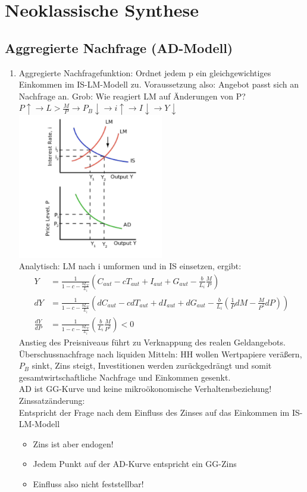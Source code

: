 \documentclass{scrartcl}
\begin{document}
\section{Neoklassische Synthese}
\subsection{Aggregierte Nachfrage (AD-Modell)}
\begin{enumerate}
  \item Aggregierte Nachfragefunktion: Ordnet jedem p ein gleichgewichtiges Einkommen im IS-LM-Modell zu. Voraussetzung also: Angebot passt sich an Nachfrage an. Grob: Wie reagiert LM auf \"{A}nderungen von P?\\
  $P \uparrow \rightarrow L > \frac{M}{P} \rightarrow P_B \downarrow \rightarrow i \uparrow \rightarrow I \downarrow \rightarrow Y \downarrow$\\
  \includegraphics[width=0.5\textwidth]{Bilder/Neoklassische_Synthese_AD_Herleitung.pdf}\\
  Analytisch: LM nach i umformen und in IS einsetzen, ergibt:
  \begin{align*}
     Y &= \frac{1}{1-c -\frac{b L_Y}{L_i}} \left(C_{aut} - c T_{aut} + I_{aut} +G_{aut} - \frac{b}{L_i}\frac{M}{P}\right)\\
     dY &= \frac{1}{1-c -\frac{b L_Y}{L_i}} \left(dC_{aut} - c dT_{aut} + dI_{aut} +dG_{aut} - \frac{b}{L_i} \left(\frac{1}{P}dM-\frac{M}{P^2}dP\right)\right)\\
     \frac{dY}{dP} &= \frac{1}{1-c -\frac{b L_Y}{L_i}} \left(\frac{b}{L_i}\frac{M}{P^2}\right) <0
  \end{align*}
  Anstieg des Preisniveaus f\"{u}hrt zu Verknappung des realen Geldangebots. \"{U}berschussnachfrage nach liquiden Mitteln: HH wollen Wertpapiere ver\"{a}{\ss}ern, $P_B$ sinkt, Zins steigt, Investitionen werden zur\"{u}ckgedr\"{a}ngt und somit gesamtwirtschaftliche Nachfrage und Einkommen gesenkt.\\
  AD ist GG-Kurve und keine mikro\"{o}konomische Verhaltensbeziehung!\\
  Zinssatz\"{a}nderung:\\
  Entspricht der Frage nach dem Einfluss des Zinses auf das Einkommen im IS-LM-Modell
  \begin{itemize}
    \item Zins ist aber endogen!
    \item Jedem Punkt auf der AD-Kurve entspricht ein GG-Zins
    \item Einfluss also nicht feststellbar!
  \end{itemize}


\end{enumerate}
\end{document}
